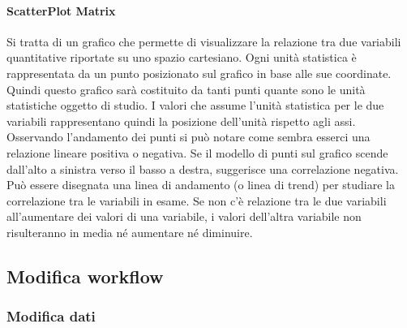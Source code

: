 \documentclass[../manuale_utente.tex]{subfiles}
\begin{document}
\paragraph{ScatterPlot Matrix}
    \label{par:vis_scatt}
Si tratta di un grafico che permette di visualizzare la relazione tra due variabili quantitative riportate su uno spazio cartesiano. Ogni unità statistica è rappresentata da un punto posizionato sul grafico in base alle sue coordinate. 
Quindi questo grafico sarà costituito da tanti punti quante sono le unità statistiche oggetto di studio. I valori che assume l’unità statistica per le due variabili rappresentano quindi la posizione dell’unità rispetto agli assi. 
Osservando l’andamento dei punti si può notare come sembra esserci una relazione lineare positiva o negativa. Se il modello di punti sul grafico scende dall'alto a sinistra verso il basso a destra, suggerisce una correlazione negativa. 
Può essere disegnata una linea di andamento (o linea di trend) per studiare la correlazione tra le variabili in esame. Se non c’è relazione tra le due variabili all’aumentare dei valori di una variabile, i valori dell’altra variabile non risulteranno in media né aumentare né diminuire.


\subsection{Modifica workflow}
    \label{sub:mod_work}
\subsubsection{Modifica dati}
    \label{subsub:mod_dati}
\end{document}
